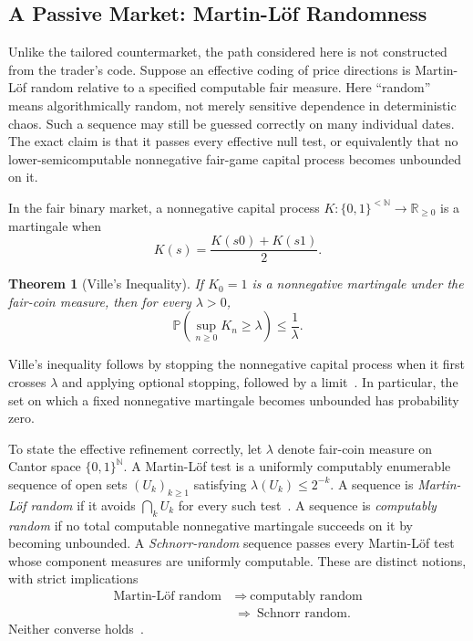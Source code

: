 \documentclass[aps,pra,reprint,superscriptaddress,amsmath,amssymb,floatfix]{revtex4-2}
\theoremstyle{plain}
\newtheorem{theorem}{Theorem}
\theoremstyle{definition}
\theoremstyle{remark}
\begin{document}
\subsection{A Passive Market: Martin-L\"of Randomness}

Unlike the tailored countermarket, the path considered here is not constructed
from the trader's code. Suppose an effective coding of price directions is
Martin-L\"of random relative to a specified computable fair measure. Here
``random'' means
algorithmically random, not merely sensitive dependence in deterministic
chaos. Such a sequence may still be guessed correctly on many individual
dates. The exact claim is that it passes every effective null test, or
equivalently that no lower-semicomputable nonnegative fair-game capital process
becomes unbounded on it.

In the fair binary market, a nonnegative capital process
\(K\colon\{0,1\}^{<\mathbb{N}}\to\mathbb{R}_{\geq0}\) is a martingale when
\begin{equation}
  K(s)=\frac{K(s0)+K(s1)}2.
  \label{eq:computablemartingale}
\end{equation}

\begin{theorem}[Ville's Inequality]
  \label{thm:ville}
  If \(K_0=1\) is a nonnegative martingale under the fair-coin measure, then
  for every \(\lambda>0\),
  \begin{equation}
    \mathbb{P}\!\left(\sup_{n\geq0}K_n\geq\lambda\right)
    \leq\frac1\lambda.
    \label{eq:ville}
  \end{equation}
\end{theorem}

Ville's inequality follows by stopping the nonnegative capital process when it
first crosses \(\lambda\) and applying optional stopping, followed by a
limit~\cite{Ville1939}. In particular, the set on which a fixed nonnegative
martingale becomes unbounded has probability zero.

To state the effective refinement correctly, let \(\lambda\) denote fair-coin
measure on Cantor space \(\{0,1\}^{\mathbb N}\). A Martin-L\"of test is a
uniformly computably enumerable sequence of open sets
\((U_k)_{k\geq1}\) satisfying \(\lambda(U_k)\leq2^{-k}\). A sequence is
\emph{Martin-L\"of random} if it avoids \(\bigcap_k U_k\) for every such
test~\cite{MartinLof1966}. A sequence is \emph{computably random} if no total
computable nonnegative martingale succeeds on it by becoming unbounded. A
\emph{Schnorr-random} sequence passes every Martin-L\"of test whose component
measures are uniformly computable. These are distinct notions, with strict
implications
\begin{equation}
  \begin{aligned}
    \text{Martin-L\"of random}
      &\ \Longrightarrow\ \text{computably random}\\
      &\ \Longrightarrow\ \text{Schnorr random}.
  \end{aligned}
  \label{eq:randomhierarchy}
\end{equation}
Neither converse holds~\cite{schnorr1,Nies2009,DH}.
\end{document}
